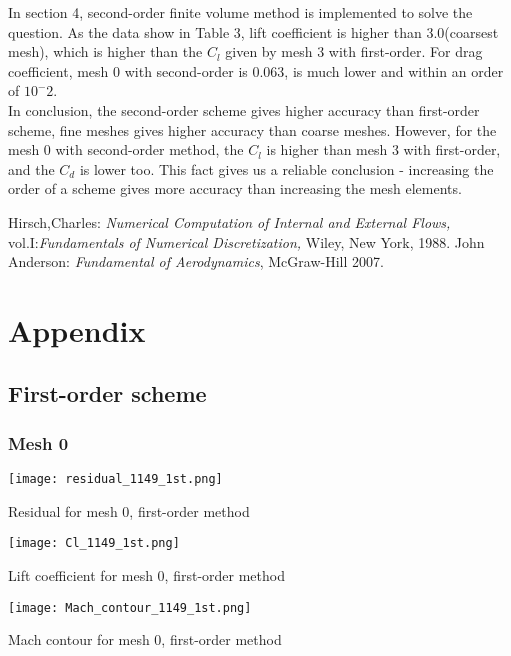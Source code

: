 \documentclass[letterpaper,onecolumn,12pt]{article}
\makeatletter
\newenvironment{figurehere}
  {\def\@captype{figure}}{}
\makeatother
\begin{document}
In section 4, second-order finite volume method is implemented to solve the question. As the data show in Table 3, lift coefficient is higher than 3.0(coarsest mesh), which is higher than the $C_l$ given by mesh 3 with first-order. For drag coefficient, mesh 0 with second-order is 0.063, is much lower and within an order of $10^-2$.\\

In conclusion, the second-order scheme gives higher accuracy than first-order scheme, fine meshes gives higher accuracy than coarse meshes. However, for the mesh 0 with second-order method, the $C_l$ is higher than mesh 3 with first-order, and the $C_d$ is lower too. This fact gives us a reliable conclusion - increasing the order of a scheme gives more accuracy than increasing the mesh elements. 
 
\begin{thebibliography}{99}
Hirsch,Charles: \textit{Numerical Computation of Internal and External Flows,} vol.I:\textit{Fundamentals of Numerical Discretization,} Wiley, New York, 1988.
John Anderson: \textit{Fundamental of Aerodynamics},  McGraw-Hill 2007.

\end{thebibliography}

\pagebreak

\section*{Appendix}

\subsection*{First-order scheme}
\subsubsection*{Mesh 0}
\begin{figurehere}
\centering
	\texttt{[image: residual\_1149\_1st.png]}
\caption*{Residual for mesh 0, first-order method}
\end{figurehere}

\begin{figurehere}
\centering
	\texttt{[image: Cl\_1149\_1st.png]}
\caption*{Lift coefficient for mesh 0, first-order method}
\end{figurehere}

\begin{figurehere}
\centering
	\texttt{[image: Mach\_contour\_1149\_1st.png]}
\caption*{Mach contour for mesh 0, first-order method}
\end{figurehere}
\end{document}
